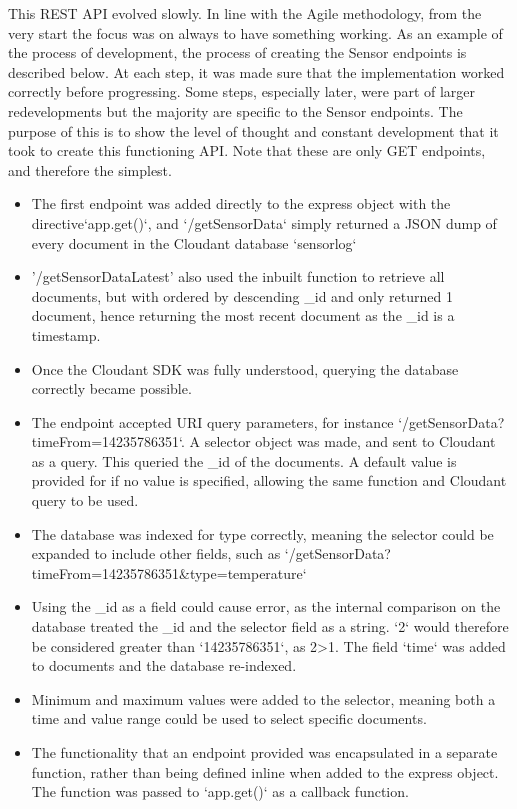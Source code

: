 \documentclass{article}
\begin{document}
This REST API evolved slowly. In line with the Agile methodology, from the very start the focus was on always to have something working. As an example of the process of development, the process of creating the Sensor endpoints is described below. At each step, it was made sure that the implementation worked correctly before progressing. Some steps, especially later, were part of larger redevelopments but the majority are specific to the Sensor endpoints. The purpose of this is to show the level of thought and constant development that it took to create this functioning API. Note that these are only GET endpoints, and therefore the simplest.

\begin{itemize}
	\item The first endpoint was added directly to the express object with the directive`app.get()`, and `/getSensorData` simply returned a JSON dump of every document in the Cloudant database `sensorlog`
	\item '/getSensorDataLatest' also used the inbuilt function to retrieve all documents, but with ordered by descending \_id and only returned 1 document, hence returning the most recent document as the \_id is a timestamp. 
	\item Once the Cloudant SDK was fully understood, querying the database correctly became possible.
	\item The endpoint accepted URI query parameters, for instance `/getSensorData?timeFrom=14235786351`. A selector object was made, and sent to Cloudant as a query. This queried the \_id of the documents. A default value is provided for if no value is specified, allowing the same function and Cloudant query to be used.
	\item The database was indexed for type correctly, meaning the selector could be expanded to include other fields, such as `/getSensorData?timeFrom=14235786351\&type=temperature`
	\item Using the \_id as a field could cause error, as the internal comparison on the database treated the \_id and the selector field as a string. `2` would therefore be considered greater than `14235786351`, as 2\textgreater 1. The field `time` was added to documents and the database re-indexed.
	\item Minimum and maximum values were added to the selector, meaning both a time and value range could be used to select specific documents.
	\item The functionality that an endpoint provided was encapsulated in a separate function, rather than being defined inline when added to the express object. The function was passed to `app.get()` as a callback function.

\end{itemize}
\end{document}
